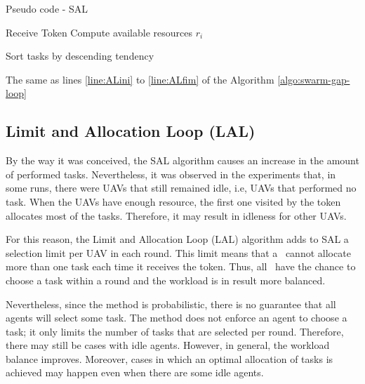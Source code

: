 \begin{algorithm}[h!t]
	\caption{Pseudo code - SAL}
	\label{algo:sal}
	
	\SetAlgoLined
	\DontPrintSemicolon
	
	\SetNlSkip{0.3em}
	
	Receive Token\;
	Compute available resources $r_i $ \; \label{line:compute_rALA}
	
	Sort tasks by descending tendency\; \label{line:sortbyTend}
	
	
	The same as lines \ref{line:ALini} to \ref{line:ALfim} of the Algorithm \ref{algo:swarm-gap-loop} \;
	
\end{algorithm}

\subsection{Limit and Allocation Loop (LAL)} \label{sec:lal}

By the way it was conceived, the SAL algorithm causes an increase in the amount of performed tasks. Nevertheless, it was observed in the experiments that, in some runs, there were UAVs that still remained idle, i.e, UAVs that performed no task. When the UAVs have enough resource, the first one visited by the token allocates most of the tasks. Therefore, it may result in idleness for other UAVs. 

For this reason, the Limit and Allocation Loop (LAL) algorithm adds to SAL a selection limit per UAV in each round. This limit means that a \uav\ cannot allocate more than one task each time it receives the token. Thus, all \uavs\ have the chance to choose a task within a round and the workload is in result more balanced. 

Nevertheless, since the method is probabilistic, there is no guarantee that all agents will select some task. The method does not enforce an agent to choose a task; it only limits the number of tasks that are selected per round. Therefore, there may still be cases with idle agents. However, in general, the workload balance improves. Moreover, cases in which an optimal allocation of tasks is achieved may happen even when there are some idle agents.
